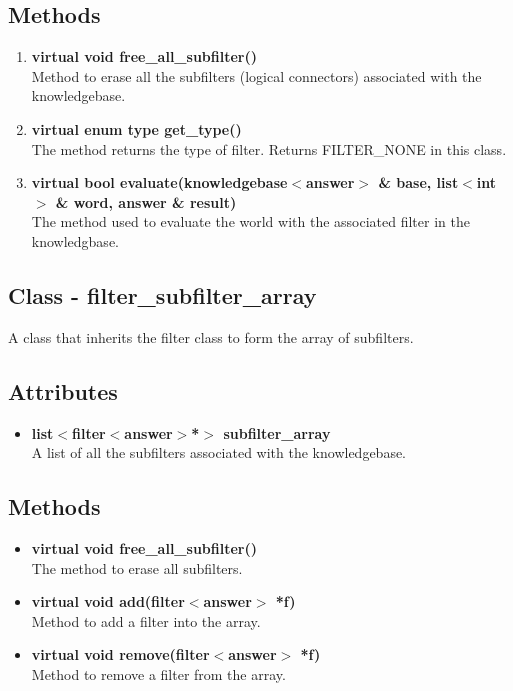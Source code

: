 \subsection*{Methods}
\begin{enumerate}
 \item \textbf{virtual void free\_all\_subfilter()} \\
	Method to erase all the subfilters (logical connectors) associated with the knowledgebase.
 \item \textbf{virtual enum type get\_type()} \\
	The method returns the type of filter. Returns FILTER\_NONE in this class.
 \item \textbf{virtual bool evaluate(knowledgebase$<$answer$>$ \& base, list$<$int$>$ \& word, answer \& result)} \\
	The method used to evaluate the world with the associated filter in the knowledgbase. 
\end{enumerate}

\subsection{Class - filter\_subfilter\_array}
A class that inherits the filter class to form the array of subfilters.
\subsection*{Attributes}
\begin{itemize}
 \item \textbf{list$<$filter$<$answer$>$*$>$ subfilter\_array} \\
	A list of all the subfilters associated with the knowledgebase.
\end{itemize}
\subsection*{Methods}
\begin{itemize}
 \item \textbf{virtual void free\_all\_subfilter()} \\
	The method to erase all subfilters.
 \item \textbf{virtual void add(filter$<$answer$>$ *f)} \\
	Method to add a filter into the array.
 \item \textbf{virtual void remove(filter$<$answer$>$ *f)} \\
	Method to remove a filter from the array.
\end{itemize}

